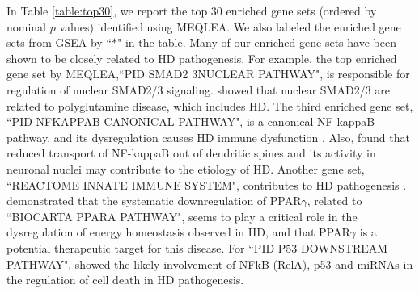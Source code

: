 \documentclass[a4,center,fleqn]{NAR}
\newcommand{\OurMethod}{MEQLEA}
\begin{document}
	In Table \ref{table:top30}, we report the top 30 enriched gene sets (ordered by nominal $p$ values)
	identified using \OurMethod. We also labeled the enriched gene sets from GSEA by ``$\ast$" in the
	table. Many of our enriched gene sets have been shown to be closely related to HD pathogenesis. For
	example, the top enriched gene set by \OurMethod,``PID SMAD2 3NUCLEAR PATHWAY", is responsible for
	regulation of nuclear SMAD2/3 signaling. \citet{katsuno2010disrupted} showed that nuclear SMAD2/3 are
	related to polyglutamine disease, which includes HD. The third enriched gene set, ``PID NFKAPPAB
	CANONICAL PATHWAY", is a canonical NF-kappaB pathway, and its dysregulation causes HD immune
	dysfunction \citep{trager2014htt}. Also, \citet{marcora2010huntington} found that reduced transport
	of NF-kappaB out of dendritic spines and its activity in neuronal nuclei may contribute to the
	etiology of HD. 
	Another gene set, ``REACTOME INNATE IMMUNE SYSTEM", contributes to HD pathogenesis
	\citep{trager2014htt, labadorf2015rna}. %
	\citet{chiang2010modulation} demonstrated that the systematic downregulation of PPAR$\gamma$,
	related to ``BIOCARTA PPARA PATHWAY", seems to play a critical role in the dysregulation of energy
	homeostasis observed in HD, and that PPAR$\gamma$ is a potential therapeutic target for this
	disease. %
	For ``PID P53 DOWNSTREAM PATHWAY", \citet{ghose2011regulation} showed the likely involvement of NFkB
	(RelA), p53 and miRNAs in the regulation of cell death in HD pathogenesis. 
	
\end{document}
